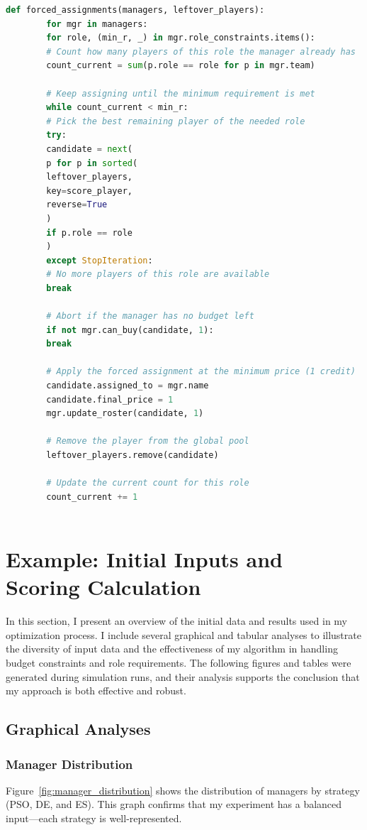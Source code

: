 \documentclass[sigconf]{acmart}
\begin{document}
	\begin{lstlisting}[language=Python, caption=Simple forced assignment to fill leftover roles]
		def forced_assignments(managers, leftover_players):
		for mgr in managers:
		for role, (min_r, _) in mgr.role_constraints.items():
		# Count how many players of this role the manager already has
		count_current = sum(p.role == role for p in mgr.team)
		
		# Keep assigning until the minimum requirement is met
		while count_current < min_r:
		# Pick the best remaining player of the needed role
		try:
		candidate = next(
		p for p in sorted(
		leftover_players,       
		key=score_player,        
		reverse=True
		)
		if p.role == role
		)
		except StopIteration:
		# No more players of this role are available
		break
		
		# Abort if the manager has no budget left
		if not mgr.can_buy(candidate, 1):
		break
		
		# Apply the forced assignment at the minimum price (1 credit)
		candidate.assigned_to = mgr.name
		candidate.final_price = 1
		mgr.update_roster(candidate, 1)
		
		# Remove the player from the global pool
		leftover_players.remove(candidate)
		
		# Update the current count for this role
		count_current += 1
		
	\end{lstlisting}
	
	\section{Example: Initial Inputs and Scoring Calculation}
	\label{sec:results}
	In this section, I present an overview of the initial data and results used in my optimization process. I include several graphical and tabular analyses to illustrate the diversity of input data and the effectiveness of my algorithm in handling budget constraints and role requirements. The following figures and tables were generated during simulation runs, and their analysis supports the conclusion that my approach is both effective and robust.
	
	\subsection{Graphical Analyses}
	
	\subsubsection{Manager Distribution}
	Figure~\ref{fig:manager_distribution} shows the distribution of managers by strategy (PSO, DE, and ES). This graph confirms that my experiment has a balanced input—each strategy is well-represented. 
	
\end{document}
